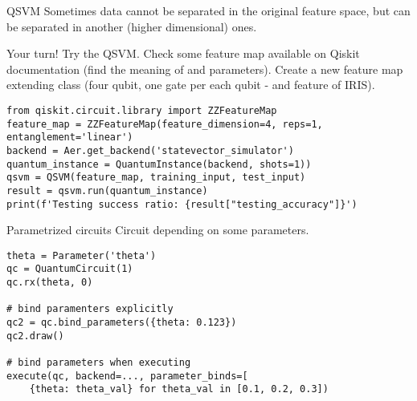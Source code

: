 \begin{frame}{QSVM}
Sometimes data cannot be separated in the original feature space, but can be separated in another (higher dimensional) ones. 




\end{frame}


\begin{frame}[fragile]{Your turn!}
Try the QSVM. Check some feature map available on Qiskit documentation (find the meaning of  and  parameters). Create a new feature map extending class  (four qubit, one  gate per each qubit - and feature of IRIS). \bigskip

\begin{verbatim}
from qiskit.circuit.library import ZZFeatureMap
feature_map = ZZFeatureMap(feature_dimension=4, reps=1, entanglement='linear')
backend = Aer.get_backend('statevector_simulator')
quantum_instance = QuantumInstance(backend, shots=1))
qsvm = QSVM(feature_map, training_input, test_input)
result = qsvm.run(quantum_instance)
print(f'Testing success ratio: {result["testing_accuracy"]}')
\end{verbatim}
\end{frame}

\begin{frame}[fragile]{Parametrized circuits}
Circuit depending on some parameters.\bigskip

\begin{verbatim}
theta = Parameter('theta')
qc = QuantumCircuit(1)
qc.rx(theta, 0)

# bind paramenters explicitly
qc2 = qc.bind_parameters({theta: 0.123})
qc2.draw()

# bind parameters when executing
execute(qc, backend=..., parameter_binds=[
    {theta: theta_val} for theta_val in [0.1, 0.2, 0.3])
\end{verbatim}
\end{frame}